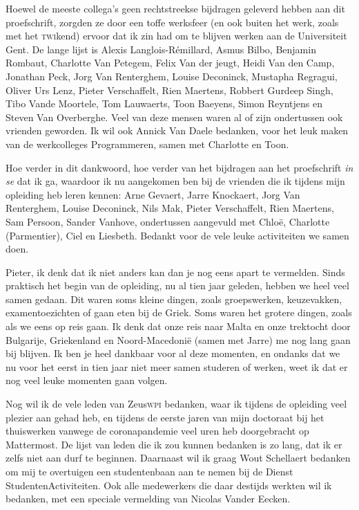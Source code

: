 \documentclass[main]{subfiles}
\begin{document}
Hoewel de meeste collega's geen rechtstreekse bijdragen geleverd hebben aan dit proefschrift, zorgden ze door een toffe werksfeer (en ook buiten het werk, zoals met het \textsc{twi}kend) ervoor dat ik zin had om te blijven werken aan de Universiteit Gent.
De lange lijst is Alexis Langlois-Rémillard, Asmus Bilbo, Benjamin Rombaut, Charlotte Van Petegem, Felix Van der jeugt, Heidi Van den Camp, Jonathan Peck, Jorg Van Renterghem, Louise Deconinck, Mustapha Regragui, Oliver Urs Lenz, Pieter Verschaffelt, Rien Maertens, Robbert Gurdeep Singh, Tibo Vande Moortele, Tom Lauwaerts, Toon Baeyens, Simon Reyntjens en Steven Van Overberghe.
Veel van deze mensen waren al of zijn ondertussen ook vrienden geworden.
Ik wil ook Annick Van Daele bedanken, voor het leuk maken van de werkcolleges Programmeren, samen met Charlotte en Toon.

Hoe verder in dit dankwoord, hoe verder van het bijdragen aan het proefschrift \textit{in se} dat ik ga, waardoor ik nu aangekomen ben bij de vrienden die ik tijdens mijn opleiding heb leren kennen: Arne Gevaert, Jarre Knockaert, Jorg Van Renterghem, Louise Deconinck, Nils Mak, Pieter Verschaffelt, Rien Maertens, Sam Persoon, Sander Vanhove, ondertussen aangevuld met Chloë, Charlotte (Parmentier), Ciel en Liesbeth.
Bedankt voor de vele leuke activiteiten we samen doen.

Pieter, ik denk dat ik niet anders kan dan je nog eens apart te vermelden.
Sinds praktisch het begin van de opleiding, nu al tien jaar geleden, hebben we heel veel samen gedaan.
Dit waren soms kleine dingen, zoals groepswerken, keuzevakken, examentoezichten of gaan eten bij de Griek.
Soms waren het grotere dingen, zoals als we eens op reis gaan.
Ik denk dat onze reis naar Malta en onze trektocht door Bulgarije, Griekenland en Noord-Macedonië (samen met Jarre) me nog lang gaan bij blijven.
Ik ben je heel dankbaar voor al deze momenten, en ondanks dat we nu voor het eerst in tien jaar niet meer samen studeren of werken, weet ik dat er nog veel leuke momenten gaan volgen.

Nog wil ik de vele leden van Zeus\textsc{wpi} bedanken, waar ik tijdens de opleiding veel plezier aan gehad heb, en tijdens de eerste jaren van mijn doctoraat bij het thuiswerken vanwege de coronapandemie veel uren heb doorgebracht op Mattermost.
De lijst van leden die ik zou kunnen bedanken is zo lang, dat ik er zelfs niet aan durf te beginnen.
Daarnaast wil ik graag Wout Schellaert bedanken om mij te overtuigen een studentenbaan aan te nemen bij de Dienst StudentenActiviteiten.
Ook alle medewerkers die daar destijds werkten wil ik bedanken, met een speciale vermelding van Nicolas Vander Eecken.
\end{document}
